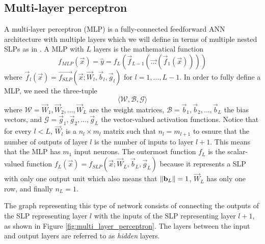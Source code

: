 \subsection{Multi-layer perceptron}
\label{sec:multi_layer_perceptron}
A multi-layer perceptron (MLP) is a fully-connected feedforward ANN architecture with multiple layers which we will define in terms of multiple nested SLPs as in \cite{burkov2019}.
A MLP with $L$ layers is the mathematical function
\begin{equation}
    f_{MLP}(\vec{x})
        = \hat{y}
        = f_L \left(
            \vec{f}_{L-1} \left(
                \vec{\dots} \left(
                    \vec{f}_1 \left(
                        \vec{x}
                    \right)
                \right)
            \right)
        \right)
\end{equation}
where $\vec{f}_l(\vec{x}) = \vec{f_{SLP}}(\vec{x}; \vec{W}_l, \vec{b}_l, \vec{g}_l)$ for $l = 1, \dots, L-1$. 
In order to fully define a MLP, we need the three-tuple
\begin{equation}
    \label{eq:mlp_three_tuple}
    \langle \mathscr{W}, \mathscr{B}, \mathscr{G} \rangle
\end{equation}
where $\mathscr{W} = \vec{W}_1, \vec{W}_2, \dots, \vec{W}_L$ are the weight matrices, $\mathscr{B} = \vec{b}_1, \vec{b}_2, \dots, \vec{b}_L$ the bias vectors, and $\mathscr{G} = \vec{g}_1, \vec{g}_2, \dots, \vec{g}_L$ the vector-valued activation functions.
Notice that for every $l < L$, $\vec{W}_l$ is a $n_l \times m_l$ matrix such that $n_l=m_{l+1}$ to esnure that the number of outputs of layer $l$ is the number of inputs to layer $l+1$.
This means that the MLP has $m_1$ input neurons.
The outermost function $f_L$ is the scalar-valued function $f_L(\vec{x}) = f_{SLP}(\vec{x}; \vec{W}_L, \vec{b}_L, \vec{g}_L)$ because it represents a SLP with only one output unit which also means that $\left\lVert\mathbf{b}_L\right\rVert=1$, $\vec{W}_L$ has only one row, and finally $n_L=1$.

The graph representing this type of network consists of connecting the outputs of the SLP representing layer $l$ with the inputs of the SLP representing layer $l+1$, as shown in Figure \ref{fig:multi_layer_perceptron}. 
The layers between the input and output layers are referred to as \textit{hidden} layers.

